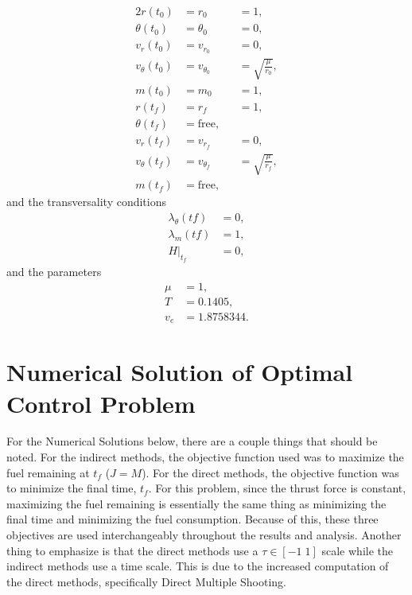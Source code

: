\documentclass[]{article}
\begin{document}
\begin{alignat*}{2}                                                                                                                                                                        
r(t_0)          &= r_0          &  &= 1, \\
\theta(t_0)     &= \theta_0     &  &= 0, \\
v_r(t_0)        &= v_{r_0}      &  &= 0, \\
v_{\theta}(t_0) &= v_{\theta_0} &  &= \sqrt{\frac{\mu}{r_0}}, \\
m(t_0)          &= m_0          &  &= 1,\\
r(t_f)          &= r_f          &  &= 1,\\
\theta(t_f)     &= \mathrm{free},        &  & \\
v_r(t_f)        &= v_{r_f}      &  &= 0, \\
v_{\theta}(t_f) &= v_{\theta_f} &  &=\sqrt{\frac{\mu}{r_f}},\\
m(t_f)          &= \mathrm{free},         &  & 
\end{alignat*}
and the transversality conditions
\begin{align*}
	\lambda_\theta(tf) &= 0, \\
	\lambda_m(tf) &= 1, \\
	H|_{t_f}   &= 0,
\end{align*}
and the parameters
\begin{align*}
	\mu &= 1, \\
	T   &= 0.1405, \\
	v_e &= 1.8758344.
\end{align*}

\section{Numerical Solution of Optimal Control Problem}
For the Numerical Solutions below, there are a couple things that should be noted. For the indirect methods, the objective function used was to maximize the fuel remaining at \(t_f\) (\(J = M\)). For the direct methods, the objective function was to minimize the final time, \(t_f\). For this problem, since the thrust force is constant, maximizing the fuel remaining is essentially the same thing as minimizing the final time and minimizing the fuel consumption. Because of this, these three objectives are used interchangeably throughout the results and analysis. Another thing to emphasize is that the direct methods use a \(\tau \in [-1\; 1]\) scale while the indirect methods use a time scale. This is due to the increased computation of the direct methods, specifically Direct Multiple Shooting.
\end{document}
